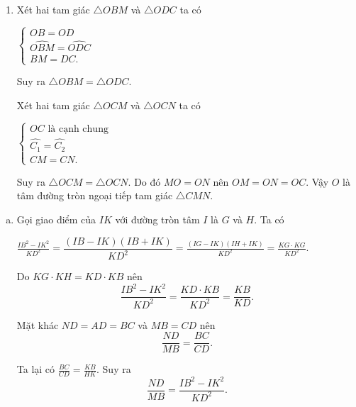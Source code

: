 \begin{bt}
{\begin{enumerate}
    	Suy ra $\widehat{OBM}=\widehat{ODC}$.  
    	
    	\item Xét hai tam giác $\triangle OBM$ và $\triangle ODC$ ta có
    	
    	$\begin{cases}
    	OB=OD\\
    	\widehat{OBM}= \widehat{ODC} \\   		
    	BM=DC.
    	\end{cases}$
    	
    	Suy ra $\triangle OBM= \triangle ODC$.
    	
    	Xét hai tam giác $\triangle OCM$ và $\triangle OCN$ ta có
    	
    	$\begin{cases}
    	OC \text{ là cạnh chung } \\
    	\widehat{C_1}=\widehat{C_2} \\
    	CM=CN.
    	\end{cases}$    	

Suy ra $\triangle OCM = \triangle OCN$. Do đó $MO=ON$ nên $OM=ON=OC$. Vậy $O$ là tâm đường tròn ngoại tiếp tam giác $\triangle CMN$.
    \end{enumerate}
    	
	\begin{enumerate}[c)]
    	\item Gọi giao điểm của $IK$ với đường tròn tâm $I$ là $G$ và $H$. Ta có
    	
    	$\displaystyle \frac{IB^2-IK^2}{KD^2}=\dfrac{(IB-IK)(IB+IK)}{KD^2}=\frac{(IG-IK)(IH+IK)}{KD^2}=\frac{KG\cdot KG}{KD^2}$.
    	
    	Do $KG\cdot KH=KD\cdot KB$ nên     	
    	$$\displaystyle \dfrac{IB^2-IK^2}{KD^2} = \dfrac{KD\cdot KB}{KD^2}=\dfrac{KB}{KD}.$$
    	
    	Mặt khác $ND=AD=BC$ và $MB=CD$ nên
    	$$\displaystyle \frac{ND}{MB}= \frac{BC}{CD}.$$
    	
    	Ta lại có $\displaystyle \frac{BC}{CD}=\frac{KB}{HK}$. Suy ra
    	$$\frac{ND}{MB}=\frac{IB^2 -IK^2}{KD^2}.$$
    \end{enumerate}
}
\end{bt}







